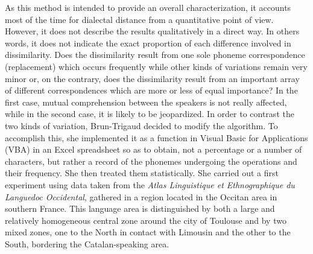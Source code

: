 \documentclass[output=paper]{LSP/langsci}
\begin{document}
As this method is intended to provide an overall characterization, it accounts most of the time for dialectal distance from a quantitative point of view. However, it does not describe the results qualitatively in a direct way. In others words, it does not indicate the exact proportion of each difference involved in dissimilarity. Does the dissimilarity result from one sole phoneme correspondence (replacement) which occurs frequently while other kinds of variations remain very minor or, on the contrary, does the dissimilarity result from an important array of different correspondences which are more or less of equal importance? In the first case, mutual comprehension between the speakers is not really affected, while in the second case, it is likely to be jeopardized. In order to contrast the two kinds of variation, Brun-Trigaud decided to modify the algorithm. To accomplish this, she implemented it as a  function in Visual Basic for Applications (VBA) in an Excel spreadsheet so as to obtain, not a percentage or a number of characters, but rather a record of the phonemes undergoing the operations and their frequency. She then treated them statistically. She carried out a first experiment \citep{brun-trigaud_usage_2014} using data taken from the \textit{Atlas Linguistique et Ethnographique du Languedoc Occidental}, gathered in a region located in the Occitan area in southern France. This language area is distinguished by both a large and relatively homogeneous central zone around the city of Toulouse and by two mixed zones, one to the North in contact with Limousin and the other to the South, bordering the Catalan-speaking area.

\begin{table}
\caption{An example of a qualitative measurement between 2 locations of enquiry for Occitan}
\label{tab:brun:2}
\end{table}
\end{document}
